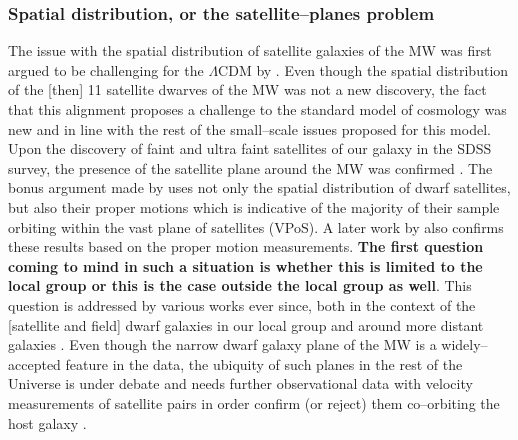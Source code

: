 \documentclass[paper=a4, fontsize=11pt]{scrartcl} %
\numberwithin{equation}{section} %
\numberwithin{figure}{section} %
\numberwithin{table}{section} %
\begin{document}





\subsubsection{Spatial distribution, or the satellite--planes problem}
The issue with the spatial distribution of satellite galaxies of the MW was first argued to be challenging for the $\Lambda$CDM by \citet[][]{Ktoupa+2005}. Even though the spatial distribution of the [then] 11 satellite dwarves of the MW was not a new discovery, the fact that this alignment proposes a challenge to the standard model of cosmology was new and in line with the rest of the small--scale issues proposed for this model. Upon the discovery of faint and ultra faint satellites of our galaxy in the SDSS survey, the presence of the satellite plane around the MW was confirmed \citep[][]{Metz+2009, Kroupa+2010}. The bonus argument made by \citet[][]{Metz+2009} uses not only the spatial distribution of dwarf satellites, but also their proper motions which is indicative of the majority of their sample orbiting within the vast plane of satellites (VPoS). A later work by \citet[][]{Pawlowski+2013} also confirms these results based on the proper motion measurements. {\bf The first question coming to mind in such a situation is whether this is limited to the local group or this is the case outside the local group as well}. This question is addressed by various works ever since, both in the context of the [satellite and field] dwarf galaxies in our local group \citep[see e.g. ][]{Ibata+2013, Pawlowski+2013, Bellazzini+2013, Pawlowski.McGaugh2014a} and around more distant galaxies \citep[see e.g. ][]{Tully+2015, Muller+2015}. Even though the narrow dwarf galaxy plane of the MW is a widely--accepted feature in the data, the ubiquity of such planes in the rest of the Universe is under debate and needs further observational data with velocity measurements of satellite pairs in order confirm (or reject) them co--orbiting the host galaxy \citet[for opposite views on the matter see e.g. ][]{Phillips+2015, Cautun+2015}.
\end{document}
